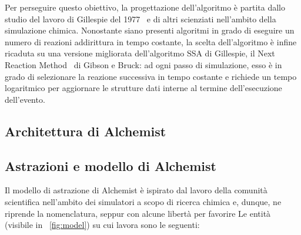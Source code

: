             Per perseguire questo obiettivo, la progettazione dell'algoritmo è partita dallo studio del lavoro di Gillespie del 1977~\cite{gillespie1977} e di altri scienziati nell'ambito della simulazione chimica. Nonostante siano presenti algoritmi in grado di eseguire un numero di reazioni addirittura in tempo costante, la scelta dell'algoritmo è infine ricaduta su una versione migliorata dell'algoritmo SSA di Gillespie, il Next Reaction Method~\cite{nextReactionMethod} di Gibson e Bruck: ad ogni passo di simulazione, esso è in grado di selezionare la reazione successiva in tempo costante e richiede un tempo logaritmico per aggiornare le strutture dati interne al termine dell'esecuzione dell'evento.

        \subsection{Architettura di Alchemist}\label{sub:architettura}

        \subsection{Astrazioni e modello di Alchemist}\label{sub:modello}
            Il modello di astrazione di Alchemist è ispirato dal lavoro della comunità scientifica nell'ambito dei simulatori a scopo di ricerca chimica e, dunque, ne riprende la nomenclatura, seppur con alcune libertà per favorire
            Le entità (visibile in \figurename~\vref{fig:model}) su cui lavora sono le seguenti:

